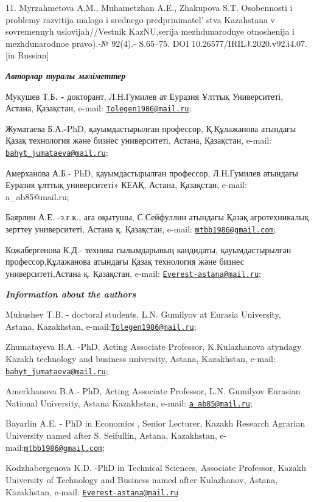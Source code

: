 11. Myrzahmetova A.M., Muhametzhan A.E., Zhakupova S.T. Osobennosti i
problemy razvitija malogo i srednego predprinimatel' stva
Kazahstana v sovremennyh uslovijah//Vestnik KazNU,serija mezhdunarodnye
otnoshenija i mezhdunarodnoe pravo).-№ 92(4).- S.65--75. DOI
10.26577/IRILJ.2020.v92.i4.07.{[}in Russian{]}

\emph{{\bfseries Авторлар туралы мәліметтер}}

Мукушев Т.Б{\bfseries . -} докторант, Л.Н.Гумилев ат Еуразия Ұлттық
Университеті, Астана, Қазақстан, e-mail:
\href{mailto:Tolegen1986@mail.ru}{\nolinkurl{Tolegen1986@mail.ru}};

Жуматаева Б.А.{\bfseries -}PhD, қауымдастырылған профессор, Қ.Құлажанова
атындағы Қазақ технология және бизнес университеті, Астана, Қазақстан,
e-mail:
\href{mailto:bahyt_jumataeva@mail.ru}{\nolinkurl{bahyt\_jumataeva@mail.ru}};

Амерханова А.Б.- PhD, қауымдастырылған профессор, Л.Н.Гумилев атындағы
Еуразия ұлттық университеті» КЕАҚ, Астана, Қазақстан, e-mail:
a\_ab85@mail.ru;

Баярлин А.Е. -э.ғ.к., аға оқытушы, С.Сейфуллин атындағы Қазақ
агротехникалық зерттеу университеті, Астана қ. Қазақстан, e-mail:
\href{mailto:mtbb1986@gmail.com}{\nolinkurl{mtbb1986@gmail.com}};

Кожабергенова К.Д.- техника ғылымдарының кандидаты, қауымдастырылған
профессор,Құлажанова атындағы Қазақ технология және бизнес
университеті,Астана қ. Қазақстан, e-mail:
\href{mailto:Everest-astana@mail.ru}{\nolinkurl{Everest-astana@mail.ru}};

\emph{{\bfseries Information about the authors}}

Mukushev T.B. - doctoral students, L.N. Gumilyov at Eurasia University,
Astana, Kazakhstan,
e-mail:\href{mailto:Tolegen1986@mail.ru}{\nolinkurl{Tolegen1986@mail.ru}};

Zhumatayeva B.A. -PhD, Acting Associate Professor, K.Kulazhanova
atyndagy Kazakh technology and business university, Astana, Kazakhstan,
e-mail:
\href{mailto:bahyt_jumataeva@mail.ru}{\nolinkurl{bahyt\_jumataeva@mail.ru}};

Amerkhanova B.A.- PhD, Acting Associate Professor, L.N. Gumilyov
Eurasian National University, Astana Kazakhstan, e-mail:
\href{mailto:a_ab85@mail.ru}{\nolinkurl{a\_ab85@mail.ru}};

Bayarlin A.E. - PhD in Economics , Senior Lecturer, Kazakh Research
Agrarian University named after S. Seifullin, Astana, Kazakhstan,
e-mail:\href{mailto:mtbb1986@gmail.com}{\nolinkurl{mtbb1986@gmail.com}};

Kodzhabergenova K.D. -PhD in Technical Sciences, Associate Professor,
Kazakh University of Technology and Business named after Kulazhanov,
Astana, Kazakhstan, e-mail:
\href{mailto:Everest-astana@mail.ru}{\nolinkurl{Everest-astana@mail.ru}}